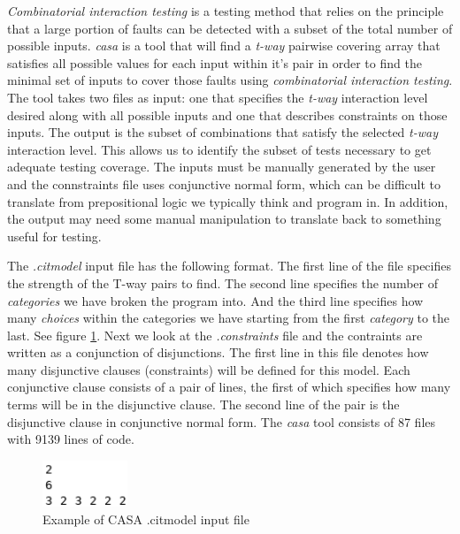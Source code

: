 \documentclass[a4full,12pt]{article}
\begin{document}
\emph{Combinatorial interaction testing} is a testing method that relies on the principle
  that a large portion of faults can be detected with a subset of the total number of 
  possible inputs. \emph{casa} is a tool that will find a \emph{t-way} pairwise covering 
  array that satisfies all possible values for each input within it's pair in order to find
  the minimal set of inputs to cover those faults using \emph{combinatorial interaction
  testing}. The tool takes two files as input: one that specifies the \emph{t-way} interaction
  level desired along with all possible inputs and one that describes constraints on those
  inputs. The output is the subset of combinations that satisfy the selected \emph{t-way}
  interaction level. This allows us to identify the subset of tests necessary to get adequate
  testing coverage. The inputs must be manually generated by the user and the connstraints
  file uses conjunctive normal form, which can be difficult to translate from prepositional
  logic we typically think and program in. In addition, the output may need some manual
  manipulation to translate back to something useful for testing.
  
The \emph{.citmodel} input file has the following format. The first line of the file
  specifies the strength of the T-way pairs to find. The second line specifies the number
  of \emph{categories} we have broken the program into. And the third line specifies how
  many \emph{choices} within the categories we have starting from the first \emph{category} to
  the last. See figure \ref{fig:casa_citmodel_input}. Next we look at the \emph{.constraints}
  file and the contraints are written as a conjunction of disjunctions. The first line in this
  file denotes how many disjunctive clauses (constraints) will be defined for this model. Each
  conjunctive clause consists of a pair of lines, the first of which specifies how many terms
  will be in the disjunctive clause. The second line of the pair is the disjunctive clause in
  conjunctive normal form.  
The \emph{casa} tool consists of 87 files with 9139 lines of code.
  
\begin{figure}[htb]
\centering
\includegraphics[width=1in,keepaspectratio]{images/casa_citmodel_input.png}
\caption{Example of CASA .citmodel input file}
\label{fig:casa_citmodel_input}
\end{figure}
\end{document}
